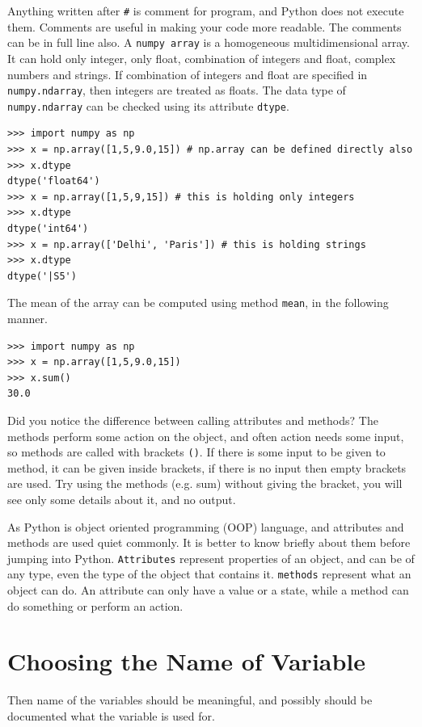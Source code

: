 \documentclass[10pt]{book}
\begin{document}
{Anything written after \verb"#" is comment for program, and Python does not execute them. Comments are useful in making your code more readable. The comments can be in full line also. A \verb"numpy array" is a homogeneous multidimensional array. It can hold only integer, only float, combination of integers and float, complex numbers and strings. If combination of integers and float are specified in \verb"numpy.ndarray", then integers are treated as floats. The data type of \verb"numpy.ndarray" can be checked using its attribute \verb"dtype". 
\beforeverb \begin{verbatim}
>>> import numpy as np
>>> x = np.array([1,5,9.0,15]) # np.array can be defined directly also
>>> x.dtype
dtype('float64')
>>> x = np.array([1,5,9,15]) # this is holding only integers
>>> x.dtype
dtype('int64')
>>> x = np.array(['Delhi', 'Paris']) # this is holding strings
>>> x.dtype
dtype('|S5')
\end{verbatim} \afterverb
The mean of the array can be computed using method \verb"mean", in the following manner.
\beforeverb
\begin{verbatim}
>>> import numpy as np
>>> x = np.array([1,5,9.0,15]) 
>>> x.sum()
30.0
\end{verbatim}
\afterverb
Did you notice the difference between calling attributes and methods? The methods perform some action on the object, and often action needs some input, so methods are called with brackets \verb"()". If there is some input to be given to method, it can be given inside brackets, if there is no input then empty brackets are used. Try using the methods (e.g. sum) without giving the bracket, you will see only some details about it, and no output. 

As Python is object oriented programming (OOP) language, and attributes and methods are used quiet commonly. It is better to know briefly about them before jumping into Python. \verb"Attributes" represent properties of an object, and can be of any type, even the type of the object that contains it. \verb"methods" represent what an object can do. An attribute can only have a value or a state, while a method can do something or perform an action. 

\section{Choosing the Name of Variable}
Then name of the variables should be meaningful, and possibly should be documented what the variable is used for. 

}
\end{document}
